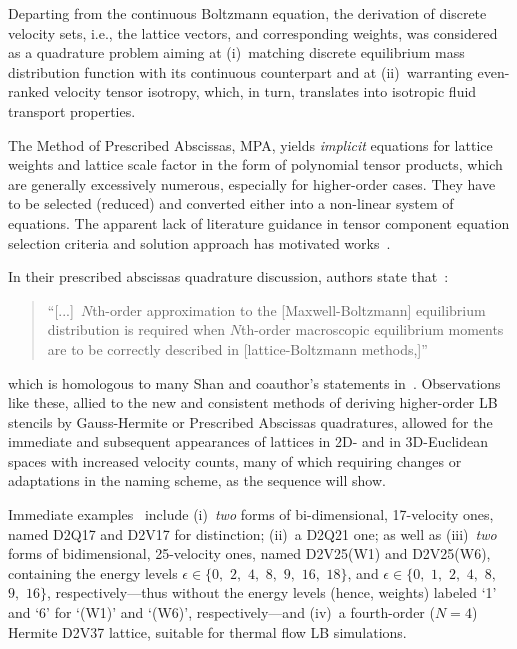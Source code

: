     Departing from the continuous Boltzmann equation, the derivation of discrete velocity sets, i.e., the lattice  vectors,  and
    corresponding weights, was considered as a quadrature problem aiming at (i)~matching discrete equilibrium mass  distribution
    function with its continuous counterpart and at (ii)~warranting  even-ranked  velocity  tensor  isotropy,  which,  in  turn,
    translates into isotropic fluid transport properties.

    The Method of Prescribed Abscissas, MPA, yields \emph{implicit} equations for lattice weights and lattice  scale  factor  in
    the form of polynomial tensor products, which are generally excessively numerous, especially for  higher-order  cases.  They
    have to be selected (reduced) and converted either into a non-linear system of equations. The apparent  lack  of  literature
    guidance   in    tensor    component    equation    selection    criteria    and    solution    approach    has    motivated
    works~\cite{2016-AndradeFN-MEngUTFPR, 2019-daRosaTG-MEngUTFPR}.

    In their prescribed abscissas quadrature discussion, authors state that~\cite[p.~6]{2006-PhilippiPC+SurmasR-PhysRevE}:
    \begin{quote}
        \swshape
        ``[...]~$N$th-order approximation to the [Maxwell-Boltzmann]  equilibrium  distribution  is  required  when  $N$th-order
        macroscopic equilibrium moments are to be correctly described in [lattice-Boltzmann methods,]''
    \end{quote}
    \noindent which is homologous to many Shan and  coauthor's  statements  in~\cite{2006-ShanX+ChenH-JFluidMech}.  Observations
    like these, allied to the new and consistent methods of deriving higher-order LB stencils  by  Gauss-Hermite  or  Prescribed
    Abscissas quadratures, allowed for the immediate and subsequent appearances of lattices in 2D- and  in  3D-Euclidean  spaces
    with increased velocity counts, many of which requiring changes or adaptations in the naming scheme, as  the  sequence  will
    show.

    Immediate examples~\cite{2006-PhilippiPC+SurmasR-PhysRevE} include (i)~\emph{two} forms of bi-dimensional, 17-velocity  ones,
    named D2Q17 and D2V17 for distinction; (ii)~a D2Q21 one; as well as (iii)~\emph{two}  forms  of  bidimensional,  25-velocity
    ones, named D2V25(W1) and D2V25(W6), containing the energy levels $\epsilon \in \{0,$ $2,$ $4,$ $8,$ $9,$ $16,$ $18\}$,  and
    $\epsilon \in \{0,$ $1,$ $2,$ $4,$ $8,$ $9,$ $16\}$, respectively---thus without the energy levels (hence, weights)  labeled
    `1' and `6' for `(W1)' and `(W6)', respectively---and (iv)~a  fourth-order  ($N=4$)  Hermite  D2V37  lattice,  suitable  for
    thermal flow LB simulations.



